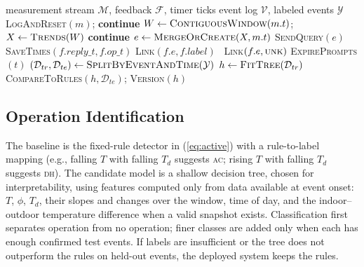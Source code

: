 \begin{algorithm}[t]
\caption{Event Monitoring and Feedback}
\label{alg:event}
\small
\begin{algorithmic}[1]
\Require measurement stream $\mathcal{M}$, feedback $\mathcal{F}$, timer ticks
\Ensure event log $\mathcal{V}$, labeled events $\mathcal{Y}$
   \textsc{LogAndReset}$(m)$; \textbf{continue} \EndIf
  \State $W\gets\textsc{ContiguousWindow}(m.t)$; $X\gets\textsc{Trends}(W)$
   \textbf{continue} \EndIf
  \State $e\gets\textsc{MergeOrCreate}(X,m.t)$
   \textsc{SendQuery}$(e)$ \EndIf
\EndFor
{}
  \State \textsc{SaveTimes}$(f.\mathit{reply\_t}, f.\mathit{op\_t})$
   \textsc{Link}$(f.e, f.\mathit{label})$
  \Else\ \textsc{Link}$(f.e, \textsc{unk})$ \EndIf
\EndFor
{}
  \State \textsc{ExpirePrompts}$(t)$ 
    \State $(\mathcal{D}_{tr},\mathcal{D}_{te})\gets\textsc{SplitByEventAndTime}(\mathcal{Y})$
    \State $h\gets\textsc{FitTree}(\mathcal{D}_{tr})$ 
    \State \textsc{CompareToRules}$(h,\mathcal{D}_{te})$; \textsc{Version}$(h)$
  \EndIf
\EndFor
\end{algorithmic}
\end{algorithm}

\subsection{Operation Identification}
The baseline is the fixed-rule detector in (\ref{eq:active}) with a rule-to-label mapping (e.g., falling $T$ with falling $T_d$ suggests \textsc{ac}; rising $T$ with falling $T_d$ suggests \textsc{dh}). The candidate model is a shallow decision tree, chosen for interpretability, using features computed only from data available at event onset: $T$, $\phi$, $T_d$, their slopes and changes over the window, time of day, and the indoor--outdoor temperature difference when a valid snapshot exists. Classification first separates operation from no operation; finer classes are added only when each has enough confirmed test events. If labels are insufficient or the tree does not outperform the rules on held-out events, the deployed system keeps the rules.
